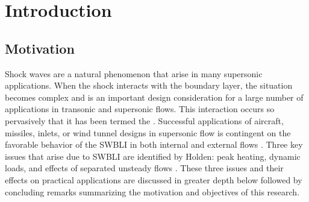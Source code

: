 \chapter{Introduction} \label{introduction}
\section{Motivation}

Shock waves are a natural phenomenon that arise in many supersonic applications. When the shock interacts with the boundary layer, the situation becomes complex and is an important design consideration for a large number of applications in transonic and supersonic flows. This interaction occurs so pervasively that it has been termed the . Successful applications of aircraft, missiles, inlets, or wind tunnel designs in supersonic flow is contingent on the favorable behavior of the SWBLI in both internal and external flows \cite{Gaitonde2013}. Three key issues that arise due to SWBLI are identified by Holden: peak heating, dynamic loads, and effects of separated unsteady flows \cite{Holden1986}. These three issues and their effects on practical applications are discussed in greater depth below followed by concluding remarks summarizing the motivation and objectives of this research.



